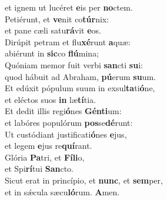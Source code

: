 \evenverse et ignem ut lucéret \textbf{e}is per \textbf{no}ctem.\\
\oddverse Petiérunt, et \textbf{ve}nit co\textbf{túr}nix:~\*\\
\oddverse et pane cæli satu\textbf{rá}vit \textbf{e}os.\\
\evenverse Dirúpit petram et flu\textbf{xé}runt \textbf{a}quæ:~\*\\
\evenverse abiérunt in \textbf{sic}co \textbf{flú}mina;\\
\oddverse Quóniam memor fuit verbi \textbf{san}cti \textbf{su}i:~\*\\
\oddverse quod hábuit ad Abraham, \textbf{pú}erum \textbf{su}um.\\
\evenverse Et edúxit pópulum suum in exsul\textbf{ta}ti\textbf{ó}ne,~\*\\
\evenverse et eléctos suos \textbf{in} læ\textbf{tí}tia.\\
\oddverse Et dedit illis regi\textbf{ó}nes \textbf{Gén}\textbf{ti}um:~\*\\
\oddverse et labóres populórum \textbf{pos}se\textbf{dé}runt:\\
\evenverse Ut custódiant justificati\textbf{ó}nes \textbf{e}jus,~\*\\
\evenverse et legem \textbf{e}jus re\textbf{quí}rant.\\
\oddverse Glória \textbf{Pa}tri, et \textbf{Fí}\textbf{li}o,~\*\\
\oddverse et Spi\textbf{rí}tui \textbf{San}cto.\\
\evenverse Sicut erat in princípio, et \textbf{nunc}, et \textbf{sem}per,~\*\\
\evenverse et in sǽcula sæcu\textbf{ló}rum. \textbf{A}men.\\
